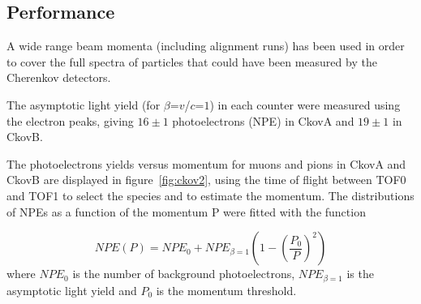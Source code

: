\subsection{Performance}
\label{SubSect:Ckov_Performance}

A wide range beam momenta (including alignment runs) has been used in order to cover the full spectra of particles that could have been measured by the Cherenkov detectors.


The asymptotic light yield (for $\beta$=$v$/$c$=$1$) in each counter were measured using the electron peaks, giving $16\pm1$ photoelectrons (NPE) in CkovA and $19\pm1$ in CkovB.

The photoelectrons yields versus momentum for muons and pions in CkovA and CkovB are displayed in figure~\ref{fig:ckov2}, using the time of flight between TOF0 and TOF1 to select the species and to estimate the momentum.
The distributions of NPEs as a function of the momentum P were fitted with the function

\begin{equation}
NPE(P) = NPE_0 + NPE_{\beta=1}\left(1-\left(\frac{P_0}{P}\right)^2\right)
\end{equation}
where $NPE_0$ is the number of background photoelectrons, $NPE_{\beta=1}$ is the asymptotic light yield and $P_0$ is the momentum threshold.

